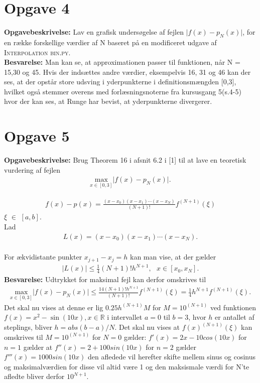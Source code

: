 \section*{Opgave 4}
\textbf{Opgavebeskrivelse:} Lav en grafisk undersøgelse af fejlen $\lvert f(x)-p_N(x) \rvert$, for en række forskellige værdier af N baseret på en modificeret udgave af \textsc{Interpolation bin.py.}
\\
\textbf{Besvarelse:} Man kan se, at approximationen passer til funktionen, når N = 15,30 og 45. Hvis der indsættes andre værdier, eksempelvis 16, 31 og 46 kan der ses, at der opstår store udsving i yderpunkterne i definitionsmængden [0,3], hvilket også stemmer overens med forlæsningsnoterne fra kursusgang 5(s.4-5) hvor der kan ses, at Runge har bevist, at yderpunkterne divergerer.
\section*{Opgave 5}
\textbf{Opgavebeskrivelse:} Brug Theorem 16 i afsnit 6.2 i [1] til at lave en teoretisk vurdering af fejlen
\begin{align*}
\underset{x \in \left [0,3 \right ]}{\text{max}} \lvert f(x)-p_N(x) \rvert.
\end{align*}

\begin{align*}
f(x)-p(x) = \frac{(x-x_0)(x-x_1)\cdots(x-x_N)}{(N+1)!}f^{(N+1)}(\xi)
\end{align*}
 $\xi$ $\in$ $\left [a,b \right ]$.
\\
Lad
\begin{align*}
L(x)=(x-x_0)(x-x_1)\cdots(x-x_N).
\end{align*}
\\
For ækvidistante punkter $x_{j+1} - x_j = h$ kan man vise, at der gælder
\begin{align*}
\lvert L(x) \rvert \leq \frac{1}{4}(N+1)!h^{N+1}, \text{   } x \in \left [x_0, x_N \right ].
\end{align*}
\textbf{Besvarelse:} 
Udtrykket for maksimal fejl kan derfor omskrives til
\begin{align*}
\underset{x \in \left [0,3 \right ]}{\text{max}} \lvert f(x)-p_N(x) \rvert \leq \frac{{1}{4}(N+1)!h^{N+1}}{(N+1)!}f^{(N+1)}(\xi)=\frac{1}{4}h^{N+1}f^{(N+1)}(\xi).
\end{align*}
Det skal nu vises at denne er lig  $0.25h^{(N+1)}M$ for $M=10^{(N+1)}$ ved funktionen $f(x)=x^2-\sin(10x), x \in \mathbb{R}$ i intervallet $a=0$ til $b=3$, hvor $h$ er antallet af steplings, bliver $h=abs(b-a)/N$. 
Det skal nu vises at $f(x)^{(N+1)}(\xi)$ kan omskrives til $M=10^{(N+1)}$
for $N=0$ gælder: $f'(x)=2x-10cos(10x)$ for $n=1$ gælder at $f''(x)=2+100sin(10x)$ for $n=2$ gælder $f'''(x)=1000sin(10x)$ den afledede vil herefter skifte mellem sinus og cosinus og maksimalværdien for disse vil altid være 1 og den maksismale værdi for N'te afledte bliver derfor $10^{N+1}$.
\\
